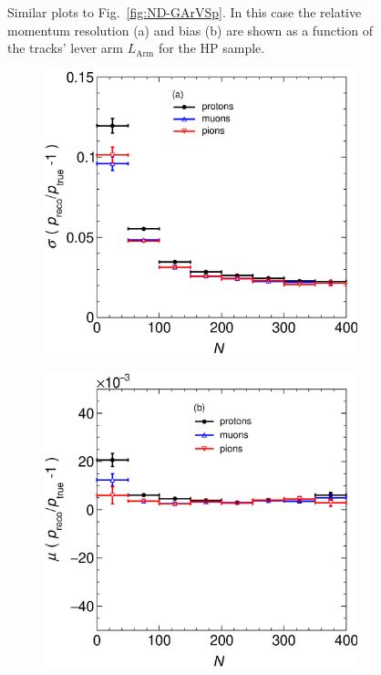 \begin{figure}[!ht]
\begin{subfigure}[b]{0.43\textwidth}
         \caption{}
         \label{fig:BiasND-GArVSLArm}
     \end{subfigure}
        \caption{Similar plots to Fig.~\ref{fig:ND-GArVSp}. In this case the relative momentum resolution (a) and bias (b) are shown as a function of the tracks' lever arm $L_\textrm{Arm}$ for the HP sample. }
        \label{fig:ND-GArVSLArm}
\end{figure}

\begin{figure}[!ht]
     \centering
     \begin{subfigure}[b]{0.43\textwidth}
         \centering
         \includegraphics[width=\textwidth]{figures/Appendix/RespVSNPoints_XL.eps}
         \caption{}
         \label{fig:ResND-GArVSNPoints}
     \end{subfigure}
     \begin{subfigure}[b]{0.43\textwidth}
         \centering
         \includegraphics[width=\textwidth]{figures/Appendix/BiaspVSNPoints_XL.eps}

\end{subfigure}
\end{figure}
